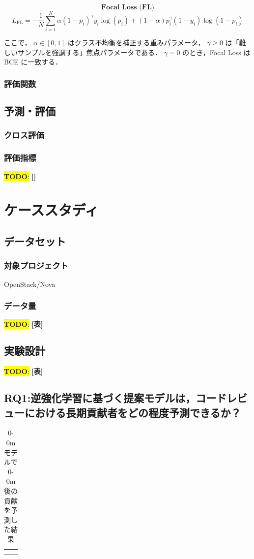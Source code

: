 \documentclass[submit,techrep,noauthor]{ipsj}
\newcommand{\todo}[1]{\colorbox{yellow}{{\bf TODO}:}{\color{red} {\textbf{[#1]}}}}
\begin{document}
\[\textbf{Focal Loss (FL)}\]
\[
L_{\mathrm{FL}} = - \frac{1}{N} \sum_{i=1}^{N} \alpha (1 - p_i)^{\gamma} y_i \log(p_i) + (1 - \alpha) p_i^{\gamma} (1 - y_i) \log(1 - p_i)
\]

ここで，
\(\alpha \in [0,1]\) はクラス不均衡を補正する重みパラメータ，  
\(\gamma \ge 0\) は「難しいサンプルを強調する」焦点パラメータである．  
\(\gamma = 0\) のとき，Focal Loss は BCE に一致する．


\subsubsection{評価関数}

\subsection{予測・評価}

\subsubsection{クロス評価}
\subsubsection{評価指標}
\todo{}


\section{ケーススタディ}
\label{config}
\subsection{データセット}
\subsubsection{対象プロジェクト}
OpenStack/Nova
\subsubsection{データ量}
\todo{表}
\subsection{実験設計}
\todo{表}



\subsection{RQ1:逆強化学習に基づく提案モデルは，コードレビューにおける長期貢献者をどの程度予測できるか？}
\begin{table}[]
    \centering
    \begin{tabular}{c|c}
         &  \\
         & 
    \end{tabular}
    \caption{0-0mモデルで0-0m後の貢献を予測した結果}
    \label{tab:placeholder}
\end{table}
\end{document}
